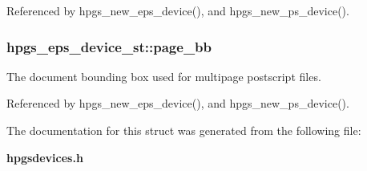 Referenced by hpgs\_\-new\_\-eps\_\-device(), and hpgs\_\-new\_\-ps\_\-device().

\subsubsection[{page\_\-bb}]{ {\bf hpgs\_\-eps\_\-device\_\-st::page\_\-bb}}\label{structhpgs__eps__device__st_a2c98ad0814627f9480f283aa2754a181}
The document bounding box used for multipage postscript files. 

Referenced by hpgs\_\-new\_\-eps\_\-device(), and hpgs\_\-new\_\-ps\_\-device().



The documentation for this struct was generated from the following file:\begin{DoxyCompactItemize}
\item 
{\bf hpgsdevices.h}\end{DoxyCompactItemize}
